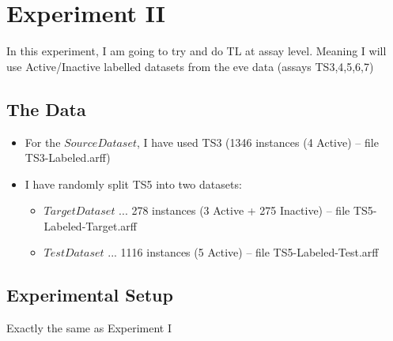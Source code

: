\documentclass[a4paper,12pt, english]{article}
\begin{document}

\newpage


\section{Experiment II}
In this experiment, I am going to try and do TL at assay level. Meaning I will use Active/Inactive labelled datasets from the eve data (assays TS3,4,5,6,7)
\subsection{The Data}
\begin{itemize}
\item For the $Source Dataset$, I have used TS3 (1346 instances (4 Active) -- file TS3-Labeled.arff)
\item I have randomly split TS5 into two datasets:
\begin{itemize}
\item $Target Dataset$ ... 278 instances (3 Active + 275 Inactive) -- file TS5-Labeled-Target.arff
\item $Test Dataset$ ... 1116 instances (5 Active) -- file TS5-Labeled-Test.arff
\end{itemize}
\end{itemize}  

\subsection{Experimental Setup}
Exactly the same as Experiment I
\end{document}
